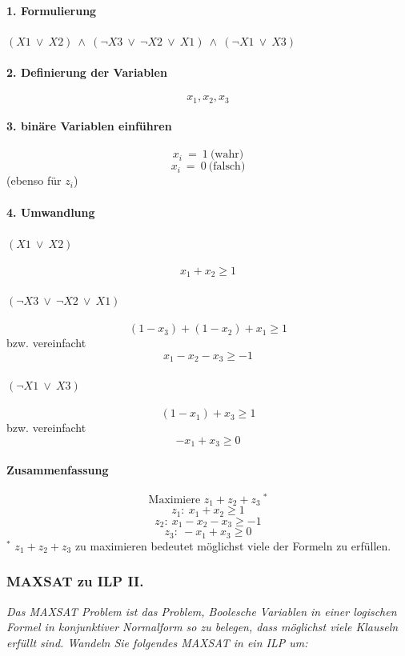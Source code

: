\documentclass{article}
\begin{document}
\paragraph{1. Formulierung}
\begin{center}
    $(X1\ \vee\ X2)\ \wedge\ (\neg X3\ \vee\ \neg X2\ \vee\ X1)\ \wedge\ ( \neg X1\ \vee\ X3)$
\end{center} 
\paragraph{2. Definierung der Variablen}
\[
x_1 , x_2 , x_3
\]
\paragraph{3. binäre Variablen einführen}
\[
x_i \ = \ 1 \ \text{(wahr)}
\]
\[
x_i \ = \ 0 \ \text{(falsch)}
\]
(ebenso für $z_i$)
\paragraph{4. Umwandlung }
\paragraph{$(X1\ \vee\ X2)$}
\[
x_1 + x_2 \geq 1
\]
\paragraph{$(\neg X3\ \vee\ \neg X2\ \vee\ X1)$}
\[
(1 - x_3)+(1 - x_2) + x_1 \geq 1 
\]
bzw. vereinfacht
\[
x_1 - x_2 - x_3 \geq -1 
\]
\paragraph{$( \neg X1\ \vee\ X3)$}
\[
(1 - x_1) + x_3 \geq 1
\]
bzw. vereinfacht
\[
 - x_1 + x_3 \geq 0
\]
\paragraph*{Zusammenfassung}
\[
    \text{Maximiere } z_1 + z_2 + z_3 \ ^*
\] 
\[
z_1:\  x_1 + x_2 \geq 1
\]
\[
z_2:\  x_1 - x_2 - x_3 \geq -1 
\]
\[
z_3:\  - x_1 + x_3 \geq 0
\]
\newline
\scriptsize{$^*$ $z_1 + z_2 + z_3 $ zu maximieren bedeutet möglichst viele der Formeln zu erfüllen.} 

\normalsize
\newpage
\subsubsection{MAXSAT zu ILP II. \textcolor{ForestGreen}{\CheckmarkBold}} 
\textit{Das MAXSAT Problem ist das Problem, Boolesche Variablen  in einer logischen Formel in konjunktiver Normalform so zu belegen, dass möglichst viele Klauseln erfüllt sind. Wandeln Sie folgendes MAXSAT in ein ILP um:}  \cite{hauptklausur21}
\end{document}
